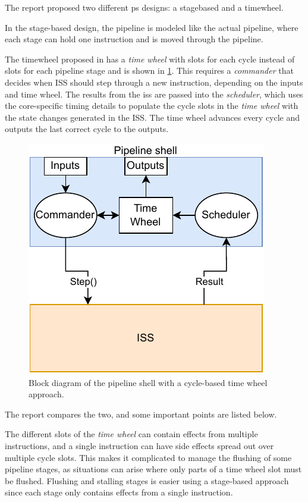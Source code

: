 The report proposed two different \gls{ps} designs: a \Gls{stagebased} and a \Gls{timewheel}. 

In the stage-based design, the pipeline is modeled like the actual pipeline, where each stage can hold one instruction and is moved through the pipeline.

The \Gls{timewheel} proposed in \cite{chiangEfficientTwolayeredCycleaccurate2009} has a \textit{time wheel} with slots for each cycle instead of slots for each pipeline stage and is shown in \cref{fig:time wheel block}. This requires a \textit{commander} that decides when ISS should step through a new instruction, depending on the inputs and time wheel. The results from the \acrshort{iss} are passed into the \textit{scheduler}, which uses the core-specific timing details to populate the cycle slots in the \textit{time wheel} with the state changes generated in the ISS. The time wheel advances every cycle and outputs the last correct cycle to the outputs.

\begin{figure}[htb]
    \centering
    \includegraphics[width=0.5\linewidth]{prosjektoppgave/time-wheel.pdf}
    \caption{Block diagram of the pipeline shell with a cycle-based time wheel approach.}
    \label{fig:time wheel block}
\end{figure}

The report compares the two, and some important points are listed below.

The different slots of the \textit{time wheel} can contain effects from multiple instructions, and a single instruction can have side effects spread out over multiple cycle slots. This makes it complicated to manage the flushing of some pipeline stages, as situations can arise where only parts of a time wheel slot must be flushed. Flushing and stalling stages is easier using a stage-based approach since each stage only contains effects from a single instruction.

